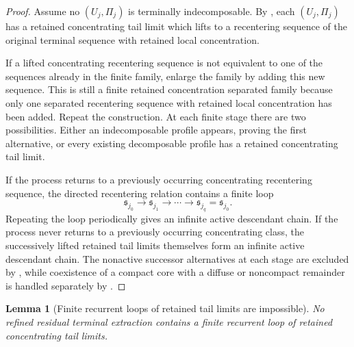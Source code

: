 \documentclass[11pt]{amsart}
\numberwithin{equation}{section}
\theoremstyle{plain}
\newtheorem{lemma}[theorem]{Lemma}
\theoremstyle{definition}
\theoremstyle{remark}
\begin{document}
\begin{proof}
Assume no \((U_j,\Pi_j)\) is terminally indecomposable.  By
, each
\((U_j,\Pi_j)\) has a retained concentrating tail limit which lifts to a
recentering sequence of the original terminal sequence with retained local
concentration.

If a lifted concentrating recentering sequence is not equivalent to one of the
sequences already in the finite family, enlarge the family by adding this new
sequence.  This is still a finite retained concentration separated family because only
one separated recentering sequence with retained local concentration has been added.  Repeat the
construction.  At each finite stage there
are two possibilities.  Either an indecomposable profile appears, proving the
first alternative, or every existing decomposable profile has a retained
concentrating tail limit.

If the process returns to a previously occurring concentrating recentering
sequence, the directed recentering relation contains a finite loop
\[
   \mathfrak s_{j_0}\to\mathfrak s_{j_1}\to\cdots
   \to\mathfrak s_{j_q}=\mathfrak s_{j_0}.
\]
Repeating the loop periodically gives an infinite active descendant chain.  If
the process never returns to a previously occurring concentrating class, the
successively lifted retained tail limits themselves form an infinite active
descendant chain.  The nonactive successor alternatives at each stage are
excluded by , while coexistence of a compact
core with a diffuse or noncompact remainder is handled separately by
.
\end{proof}

\begin{lemma}[Finite recurrent loops of retained tail limits are impossible]
\label{lem:no-finite-recurrent-cycle}
No refined residual terminal extraction contains a finite recurrent loop of retained
concentrating tail limits.
\end{lemma}
\end{document}
